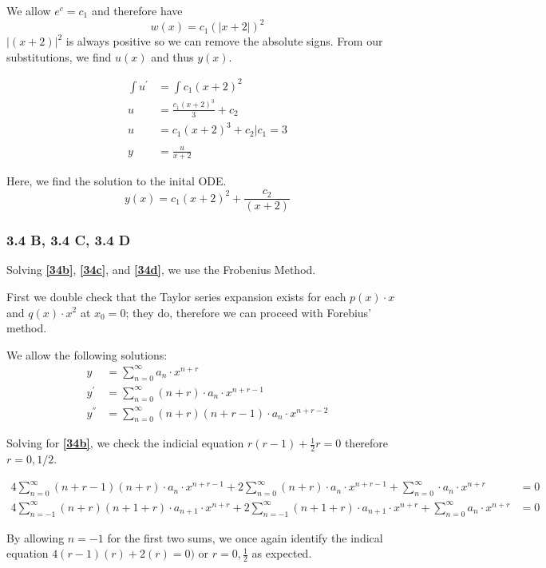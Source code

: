 \documentclass{article}
\begin{document}
We allow $e^c = c_1$ and therefore have
$$ w(x) = c_1(\left|x+2\right|)^2 $$
$|(x+2)|^2$ is always positive so we can remove the absolute signs. From our substitutions, we find $u(x)$ and thus $y(x)$.

\begin{align*}
\int{u^{'}} &= \int{c_1(x+2)^2}\\
u &= \frac{c_1(x+2)^3}{3} + c_2\\
u &= c_1(x+2)^3 + c_2 \Bigr|c_1 = 3\\\\
y &= \frac{u}{x+2}
\end{align*}

Here, we find the solution to the inital ODE.
\[
y(x) = c_1(x+2)^2 + \frac{c_2}{(x+2)}
\]

\subsubsection*{3.4 B, 3.4 C, 3.4 D}
Solving \textbf{\eqref{34b}}, \textbf{\eqref{34c}}, and \textbf{\eqref{34d}}, we use the Frobenius Method.

First we double check that the Taylor series expansion exists for each $p(x) \cdot x$ and $q(x) \cdot x^2$ at $x_0=0$; they do, therefore we can proceed with Forebius' method.


We allow the following solutions:
\begin{align}\label{frobenius}
y &= \sum_{n=0}^{\infty}{a_n\cdot x^{n+r}}\\
y^{'} &= \sum_{n=0}^{\infty}{(n+r) \cdot a_n \cdot x^{n+r-1}}\\
y^{''} &= \sum_{n=0}^{\infty}{(n+r)(n+r-1) \cdot a_n \cdot x^{n+r-2}}
\end{align}

Solving for \textbf{\eqref{34b}}, we check the indicial equation $r(r-1)+\frac{1}{2}r = 0$ therefore $r =0,1/2$.

\begin{align*}
4\sum_{n=0}^{\infty}(n+r-1)(n+r) \cdot a_n \cdot x^{n+r-1} + 2\sum_{n=0}^{\infty}(n+r) \cdot a_n \cdot x^{n+r-1} + \sum_{n=0}^{\infty} \cdot a_n \cdot x^{n+r} &= 0 \\
4\sum_{n=-1}^{\infty}(n+r)(n+1+r) \cdot a_{n+1} \cdot x^{n+r} + 2\sum_{n=-1}^{\infty} (n+1+r) \cdot a_{n+1} \cdot x^{n+r} + \sum_{n=0}^{\infty} a_n \cdot x^{n+r} &= 0
\end{align*}

By allowing $n=-1$ for the first two sums, we once again identify the indical equation $4(r-1)(r) + 2(r) = 0)$ or $r=0,\frac{1}{2}$ as expected.
\end{document}
